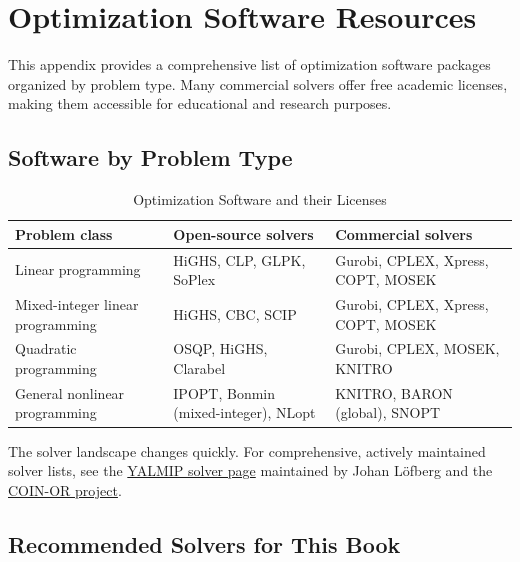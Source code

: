 
\chapter{Optimization Software Resources}
\label{app:software}

This appendix provides a comprehensive list of optimization software packages organized by problem type. Many commercial solvers offer free academic licenses, making them accessible for educational and research purposes.

\section{Software by Problem Type}

\begin{table}[H]
\centering
\small
\small
\begin{tabular}{p{3.2cm}p{5.4cm}p{4.6cm}}
\hline
\textbf{Problem class} & \textbf{Open-source solvers} & \textbf{Commercial solvers}\footnotemark \\ \hline
Linear programming & HiGHS, CLP, GLPK, SoPlex & Gurobi, CPLEX, Xpress, COPT, MOSEK \\[0.4em]
Mixed-integer linear programming & HiGHS, CBC, SCIP\footnotemark & Gurobi, CPLEX, Xpress, COPT, MOSEK \\[0.4em]
Quadratic programming & OSQP, HiGHS, Clarabel & Gurobi, CPLEX, MOSEK, KNITRO \\[0.4em]
General nonlinear programming & IPOPT, Bonmin (mixed-integer), NLopt & KNITRO, BARON (global), SNOPT \\ \hline
\end{tabular}
\caption{Optimization Software and their Licenses}
\label{tab:optimization_software_appendix}
\end{table}

The solver landscape changes quickly. For comprehensive, actively maintained solver lists, see the \href{https://yalmip.github.io/allsolvers/}{YALMIP solver page} maintained by Johan L\"ofberg and the \href{https://www.coin-or.org/}{COIN-OR project}.


\section{Recommended Solvers for This Book}

